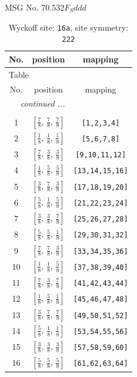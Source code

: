 \documentclass[fleqn,8pt]{jsarticle}
\begin{document}
\setcounter{MaxMatrixCols}{32}

\renewcommand{\tablename}{Table~}
\renewcommand{\figurename}{Figure~}
\begin{center}
\LARGE
MSG No. 70.532\quad$F_{S}ddd$
\end{center}
\renewcommand{\arraystretch}{1.2}
\begin{longtable}{ccc}
\caption{Wyckoff site: {\tt 16a}, site symmetry: {\tt 222}}
 \\
 \hline \hline
No. & position & mapping \\ \hline \endfirsthead

\multicolumn{2}{l}{\tablename\ \thetable{}} \\
 \hline \hline
No. & position & mapping \\ \hline \endhead

 \hline \hline
\multicolumn{2}{r}{\footnotesize\it continued ...} \\ \endfoot

 \hline \hline
\multicolumn{2}{r}{} \\ \endlastfoot

1 & $\left[ \frac{7}{8},\, \frac{7}{8},\, \frac{7}{8} \right]$ & {\tt [1,2,3,4]} \\ \hline
2 & $\left[ \frac{1}{8},\, \frac{1}{8},\, \frac{1}{8} \right]$ & {\tt [5,6,7,8]} \\ \hline
3 & $\left[ \frac{7}{8},\, \frac{3}{8},\, \frac{3}{8} \right]$ & {\tt [9,10,11,12]} \\ \hline
4 & $\left[ \frac{1}{8},\, \frac{5}{8},\, \frac{5}{8} \right]$ & {\tt [13,14,15,16]} \\ \hline
5 & $\left[ \frac{3}{8},\, \frac{7}{8},\, \frac{3}{8} \right]$ & {\tt [17,18,19,20]} \\ \hline
6 & $\left[ \frac{5}{8},\, \frac{1}{8},\, \frac{5}{8} \right]$ & {\tt [21,22,23,24]} \\ \hline
7 & $\left[ \frac{3}{8},\, \frac{3}{8},\, \frac{7}{8} \right]$ & {\tt [25,26,27,28]} \\ \hline
8 & $\left[ \frac{5}{8},\, \frac{5}{8},\, \frac{1}{8} \right]$ & {\tt [29,30,31,32]} \\ \hline
9 & $\left[ \frac{7}{8},\, \frac{7}{8},\, \frac{3}{8} \right]$ & {\tt [33,34,35,36]} \\ \hline
10 & $\left[ \frac{1}{8},\, \frac{1}{8},\, \frac{5}{8} \right]$ & {\tt [37,38,39,40]} \\ \hline
11 & $\left[ \frac{7}{8},\, \frac{3}{8},\, \frac{7}{8} \right]$ & {\tt [41,42,43,44]} \\ \hline
12 & $\left[ \frac{1}{8},\, \frac{5}{8},\, \frac{1}{8} \right]$ & {\tt [45,46,47,48]} \\ \hline
13 & $\left[ \frac{3}{8},\, \frac{7}{8},\, \frac{7}{8} \right]$ & {\tt [49,50,51,52]} \\ \hline
14 & $\left[ \frac{5}{8},\, \frac{1}{8},\, \frac{1}{8} \right]$ & {\tt [53,54,55,56]} \\ \hline
15 & $\left[ \frac{3}{8},\, \frac{3}{8},\, \frac{3}{8} \right]$ & {\tt [57,58,59,60]} \\ \hline
16 & $\left[ \frac{5}{8},\, \frac{5}{8},\, \frac{5}{8} \right]$ & {\tt [61,62,63,64]} \\
\end{longtable}
\end{document}
